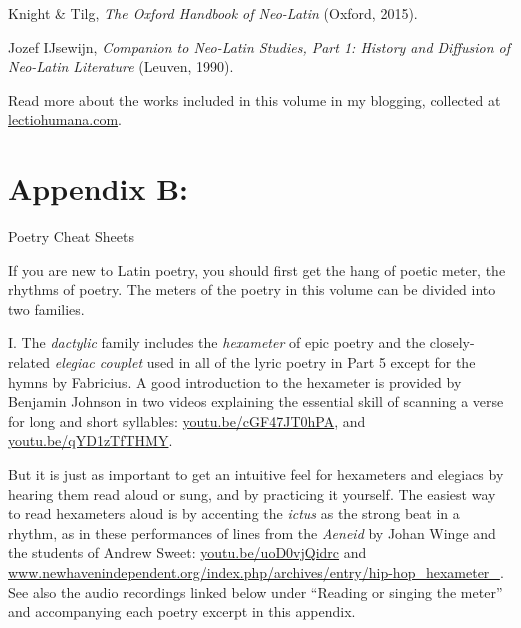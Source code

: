 \documentclass[20pt, twoside]{extarticle}
\begin{document}
\begin{singlespace}
\begin{en}
\hi\noindent Knight \& Tilg, \emph{The Oxford Handbook of Neo-Latin} (Oxford, 2015).

\hi\noindent Jozef IJsewijn, \emph{Companion to Neo-Latin Studies, Part 1: History and Diffusion of Neo-Latin Literature} (Leuven, 1990).

\vspace*{.5em}
\noindent
Read more about the works included in this volume in my blogging, collected at \url{lectiohumana.com}.

\vspace*{\fill}


\clearpage
\setlength{\parskip}{0em}
\thispagestyle{empty}
\part[Appendix B: Poetry Cheat Sheets]{Appendix B:}
{\LARGE\centering Poetry Cheat Sheets\par}

\vspace{1.5em}
\setlength{\parskip}{1em}
\noindent
If you are new to Latin poetry, you should first get the hang of poetic meter, the rhythms of poetry. The meters of the poetry in this volume can be divided into two families.

\noindent
I. The \emph{dactylic} family includes the \emph{hexameter} of epic poetry and the closely-related \emph{elegiac couplet} used in all of the lyric poetry in Part 5 except for the hymns by Fabricius. A good introduction to the hexameter is provided by Benjamin Johnson in two videos explaining the essential skill of scanning a verse for long and short syllables: \url{youtu.be/cGF47JT0hPA}, and \url{youtu.be/qYD1zTfTHMY}. 

\noindent
But it is just as important to get an intuitive feel for hexameters and elegiacs by hearing them read aloud or sung, and by practicing it yourself. The easiest way to read hexameters aloud is by accenting the \emph{ictus} as the strong beat in a rhythm, as in these performances of lines from the \emph{Aeneid} by Johan Winge and the students of Andrew Sweet: \url{youtu.be/uoD0vjQidrc} and \url{www.newhavenindependent.org/index.php/archives/entry/hip-hop_hexameter_}. See also the audio recordings linked below under “Reading or singing the meter” and accompanying each poetry excerpt in this appendix.


\end{en}
\end{singlespace}
\end{document}
